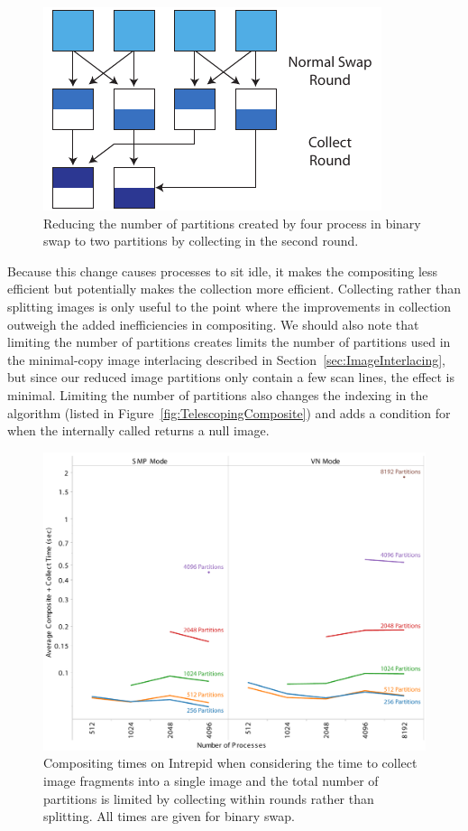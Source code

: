 \documentclass{acm_proc_article-sp}
\begin{document}
\begin{figure}[htbp]
  \centering
  \includegraphics{images/CollectRounds}
  \caption{Reducing the number of partitions created by four process in
    binary swap to two partitions by collecting in the second round.}
  \label{fig:CollectRounds}
\end{figure}

Because this change causes processes to sit idle, it makes the compositing
less efficient but potentially makes the collection more efficient.
Collecting rather than splitting images is only useful to the point where
the improvements in collection outweigh the added inefficiencies in
compositing.  We should also note that limiting the number of partitions
creates limits the number of partitions used in the minimal-copy image
interlacing described in Section~\ref{sec:ImageInterlacing}, but since our
reduced image partitions only contain a few scan lines, the effect is
minimal.  Limiting the number of partitions also changes the indexing in
the  algorithm (listed in
Figure~\ref{fig:TelescopingComposite}) and adds a condition for when the
internally called  returns a null image.

\begin{figure}[htbp]
  \centering
  \includegraphics[width=\linewidth]{images/PartitionCollectIntrepidReduced}
  \caption{Compositing times on Intrepid when considering the time to
    collect image fragments into a single image and the total number of
    partitions is limited by collecting within rounds rather than
    splitting.  All times are given for binary swap.}
  \label{fig:PartitionCollectReduced}
\end{figure}
\end{document}
